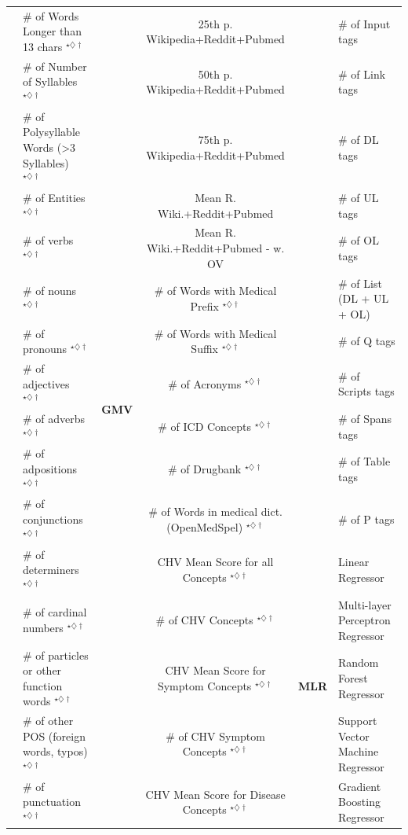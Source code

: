 \documentclass[10pt,a4paper]{article}
\begin{document}
\begin{table}[tb]
{\begin{tabular}{llccll}
			& \# of Words Longer than 13 chars $^{\star\diamondsuit\dagger}$  &  & 25th p. Wikipedia+Reddit+Pubmed  &  & \# of Input tags\tabularnewline
			& \# of Number of Syllables $^{\star\diamondsuit\dagger}$  &  & 50th p. Wikipedia+Reddit+Pubmed  &  & \# of Link tags\tabularnewline
			& \# of Polysyllable Words (\textgreater{}3 Syllables) $^{\star\diamondsuit\dagger}$  &  & 75th p. Wikipedia+Reddit+Pubmed  &  & \# of DL tags\tabularnewline
			\cline{1-2}
			\multirow{20}{*}{\textbf{\makecell{NLF}}}  & \# of Entities $^{\star\diamondsuit\dagger}$  &  & Mean R. Wiki.+Reddit+Pubmed  &  & \# of UL tags\tabularnewline
			& \# of verbs $^{\star\diamondsuit\dagger}$  &  & Mean R. Wiki.+Reddit+Pubmed - w. OV  &  & \# of OL tags\tabularnewline
			\cline{3-4} 
			& \# of nouns $^{\star\diamondsuit\dagger}$  & \multirow{6}{*}{\textbf{GMV}}  & \# of Words with Medical Prefix $^{\star\diamondsuit\dagger}$  &  & \# of List (DL + UL + OL)\tabularnewline
			& \# of pronouns $^{\star\diamondsuit\dagger}$  &  & \# of Words with Medical Suffix $^{\star\diamondsuit\dagger}$  &  & \# of Q tags\tabularnewline
			& \# of adjectives $^{\star\diamondsuit\dagger}$  &  & \# of Acronyms $^{\star\diamondsuit\dagger}$  &  & \# of Scripts tags\tabularnewline
			& \# of adverbs $^{\star\diamondsuit\dagger}$  &  & \# of ICD Concepts $^{\star\diamondsuit\dagger}$  &  & \# of Spans tags\tabularnewline
			& \# of adpositions $^{\star\diamondsuit\dagger}$  &  & \# of Drugbank $^{\star\diamondsuit\dagger}$  &  & \# of Table tags\tabularnewline
			& \# of conjunctions $^{\star\diamondsuit\dagger}$  &  & \# of Words in medical dict. (OpenMedSpel) $^{\star\diamondsuit\dagger}$  &  & \# of P tags\tabularnewline
			\cline{3-6}
			& \# of determiners $^{\star\diamondsuit\dagger}$  & \multirow{6}{*}{\textbf{\makecell{CMV}}}  & CHV Mean Score for all Concepts $^{\star\diamondsuit\dagger}$  & \multirow{6}{*}{\textbf{MLR}}  & Linear Regressor\tabularnewline
			& \# of cardinal numbers $^{\star\diamondsuit\dagger}$  &  & \# of CHV Concepts $^{\star\diamondsuit\dagger}$  &  & Multi-layer Perceptron Regressor\tabularnewline
			& \# of particles or other function words $^{\star\diamondsuit\dagger}$  &  & CHV Mean Score for Symptom Concepts $^{\star\diamondsuit\dagger}$  &  & Random Forest Regressor\tabularnewline
			& \# of other POS (foreign words, typos) $^{\star\diamondsuit\dagger}$  &  & \# of CHV Symptom Concepts $^{\star\diamondsuit\dagger}$  &  & Support Vector Machine Regressor\tabularnewline
			& \# of punctuation $^{\star\diamondsuit\dagger}$  &  & CHV Mean Score for Disease Concepts $^{\star\diamondsuit\dagger}$  &  & Gradient Boosting Regressor\tabularnewline

\end{tabular}}
\end{table}
\end{document}
